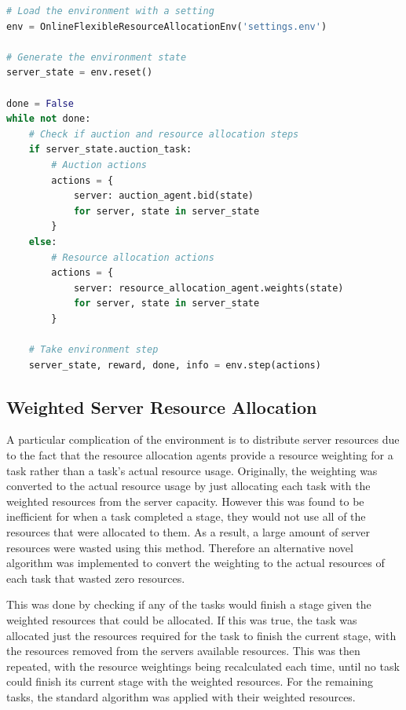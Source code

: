 \begin{lstlisting}[language=Python, frame=single, captionpos=b, label={lst:example_flexible_resource_env},
                   caption={Example running of the Online Flexible Resource allocation environment}]
# Load the environment with a setting
env = OnlineFlexibleResourceAllocationEnv('settings.env')

# Generate the environment state
server_state = env.reset()

done = False
while not done:
    # Check if auction and resource allocation steps
    if server_state.auction_task:
        # Auction actions
        actions = {
            server: auction_agent.bid(state)
            for server, state in server_state
        }
    else:
        # Resource allocation actions
        actions = {
            server: resource_allocation_agent.weights(state)
            for server, state in server_state
        }

    # Take environment step
    server_state, reward, done, info = env.step(actions)
\end{lstlisting}

\subsection{Weighted Server Resource Allocation}
\label{subsec:weighted-server-resource-allocation}
A particular complication of the environment is to distribute server resources due to the fact that the resource
allocation agents provide a resource weighting for a task rather than a task's actual resource usage. Originally, the
weighting was converted to the actual resource usage by just allocating each task with the weighted resources from
the server capacity. However this was found to be inefficient for when a task completed a stage, they
would not use all of the resources that were allocated to them. As a result, a large amount of server resources
were wasted using this method. Therefore an alternative novel algorithm was implemented to convert the weighting to
the actual resources of each task that wasted zero resources.

This was done by checking if any of the tasks would finish a stage given the weighted resources that could be allocated.
If this was true, the task was allocated just the resources required for the task to finish the current stage,
with the resources removed from the servers available resources. This was then repeated, with the resource weightings
being recalculated each time, until no task could finish its current stage with the weighted resources. For the
remaining tasks, the standard algorithm was applied with their weighted resources.

